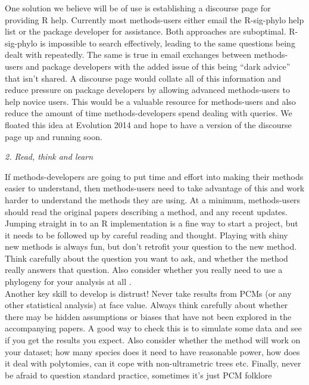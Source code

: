 \documentclass[a4paper,12pt]{article}
\renewcommand{\subsection}[1]{
  \bigskip
  \begin{center}
  \begin{large}
  \normalfont\itshape #1
  \end{large}
  \end{center}
}
\begin{document}
One solution we believe will be of use is establishing a discourse page for providing R help. 
Currently most methods-users either email the R-sig-phylo help list or the package developer for assistance. 
Both approaches are suboptimal. 
R-sig-phylo is impossible to search effectively, leading to the same questions being dealt with repeatedly. 
The same is true in email exchanges between methods-users and package developers with the added issue of this being ``dark advice'' that isn't shared. 
A discourse page would collate all of this information and reduce pressure on package developers by allowing advanced methods-users to help novice users. 
This would be a valuable resource for methods-users and also reduce the amount of time methods-developers spend dealing with queries.
We floated this idea at Evolution 2014 and hope to have a version of the discourse page up and running soon.

\subsection{2. Read, think and learn}
If methods-developers are going to put time and effort into making their methods easier to understand, then methods-users need to take advantage of this and work harder to understand the methods they are using. 
At a minimum, methods-users should read the original papers describing a method, and any recent updates. 
Jumping straight in to an R implementation is a fine way to start a project, but it needs to be followed up by careful reading and thought. 
Playing with shiny new methods is always fun, but don't retrofit your question to the new method. 
Think carefully about the question you want to ask, and whether the method really answers that question. 
Also consider whether you really need to use a phylogeny for your analysis at all \citep{losos2011seeing}.\\

Another key skill to develop is distrust! 
Never take results from PCMs (or any other statistical analysis) at face value. 
Always think carefully about whether there may be hidden assumptions or biases that have not been explored in the accompanying papers. 
A good way to check this is to simulate some data and see if you get the results you expect. 
Also consider whether the method will work on your dataset; how many species does it need to have reasonable power, how does it deal with polytomies, can it cope with non-ultrametric trees etc.
Finally, never be afraid to question standard practice, sometimes it's just PCM folklore
\end{document}

